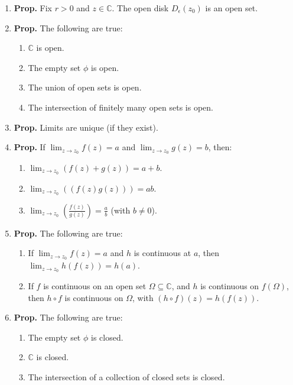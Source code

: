 \documentclass[12pt]{article}
\theoremstyle{definition}
\theoremstyle{named}
\begin{document}
{\begin{multicols}{2}
\begin{spacing}{1.01}
\begin{enumerate}
\begin{enumerate}
        \item $|z_1w_1 + \dots + z_nw_n| \leq \sqrt{|z_1|^2 + \dots + |z_n|^2}\sqrt{|w_1|^2 + \dots + |w_n|^2}$. 
    \end{enumerate}
    \item \textbf{Prop. } Fix $r>0$ and $z \in \mathbb{C}$. The open disk $D_{\epsilon}(z_0)$ is an open set. 
    \item \textbf{Prop. } The following are true: 
    \begin{enumerate}
        \item $\mathbb{C}$ is open. 
        \item The empty set $\phi$ is open. 
        \item The union of open sets is open. 
        \item The intersection of finitely many open sets is open. 
    \end{enumerate}
    \item \textbf{Prop. } Limits are unique (if they exist). 
    \item \textbf{Prop. } If $\lim_{z \to z_0} f(z) = a$ and $\lim_{z \to z_0} g(z) = b$, then: 
    \begin{enumerate}
        \item $\lim_{z \to z_0} (f(z) + g(z)) = a+b$. 
        \item $\lim_{z \to z_0} ((f(z)g(z))) = ab$. 
        \item $\lim_{z \to z_0} \left(\frac{f(z)}{g(z)}\right) = \frac{a}{b}$ (with $b \neq 0$). 
    \end{enumerate}
    \item \textbf{Prop. } The following are true: 
    \begin{enumerate}
    \item If $\lim_{z \to z_0} f(z) = a$ and $h$ is continuous at $a$, then $\lim_{z \to z_0} h(f(z)) = h(a)$. 
    \item If $f$ is continuous on an open set $\Omega \subseteq \mathbb{C}$, and $h$ is continuous on $f(\Omega)$, then $h \circ f$ is continuous on $\Omega$, with $(h \circ f)(z) = h(f(z))$. 
    \end{enumerate}
    \item \textbf{Prop. } The following are true: 
    \begin{enumerate}
        \item The empty set $\phi$ is closed. 
        \item $\mathbb{C}$ is closed. 
        \item The intersection of a collection of closed sets is closed. 

\end{enumerate}
\end{enumerate}
\end{spacing}
\end{multicols}}
\end{document}
